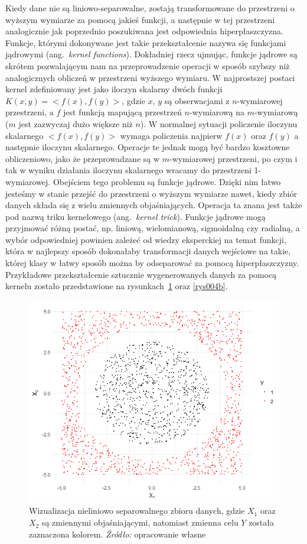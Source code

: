 \documentclass[12pt,a4paper,twoside,openany]{book}
\begin{document}
Kiedy dane nie są liniowo-separowalne, zostają transformowane do przestrzeni o wyższym wymiarze za pomocą jakieś funkcji, a następnie w tej przestrzeni analogicznie jak poprzednio poszukiwana jest odpowiednia hiperpłaszczyzna. Funkcje, którymi dokonywane jest takie przekształcenie nazywa się funkcjami jądrowymi (ang.~\textit{kernel functions}). Dokładniej rzecz ujmując, funkcje jądrowe są skrótem pozwalającym nam na przeprowadzenie operacji w sposób szybszy niż analogicznych obliczeń w przestrzeni wyższego wymiaru. W najprostszej postaci kernel zdefiniowany jest jako iloczyn skalarny dwóch funkcji $K(x, y) = <f(x), f(y)>$, gdzie $x$, $y$ są obserwacjami z $n$-wymiarowej przestrzeni, a $f$ jest funkcją mapującą przestrzeń $n$-wymiarową na $m$-wymiarową ($m$ jest zazwyczaj dużo większe niż $n$). W normalnej sytuacji policzenie iloczynu skalarnego $<f(x), f(y)>$ wymaga policzenia najpierw $f(x)$ oraz $f(y)$ a następnie iloczynu skalarnego. Operacje te jednak mogą być bardzo kosztowne obliczeniowo, jako że przeprowadzane są w $m$-wymiarowej przestrzeni, po czym i tak w wyniku działania iloczynu skalarnego wracamy do przestrzeni 1-wymiarowej. Obejściem tego problemu są funkcje jądrowe. Dzięki nim łatwo jesteśmy w stanie przejść do przestrzeni o wyższym wymiarze nawet, kiedy zbiór danych składa się z wielu zmiennych objaśniających. Operacja ta znana jest także pod nazwą triku kernelowego (ang.~\textit{kernel trick}). Funkcje jądrowe mogą przyjmować różną postać, np. liniową, wielomianową, sigmoidalną czy radialną, a wybór odpowiedniej powinien zależeć od wiedzy eksperckiej na temat funkcji, która w najlepszy sposób dokonałaby transformacji danych wejściowe na takie, której klasy w łatwy sposób można by odseparować za pomocą hiperpłaszczyzny. Przykładowe przekształcenie sztucznie wygenerowanych danych za pomocą kernelu zostało przedstawione na rysunkach~\ref{rys004a} oraz \ref{rys004b}.

\begin{figure}
\centering
\includegraphics[scale=0.82]{./rys004a}
\caption {Wizualizacja nieliniowo separowalnego zbioru danych, gdzie $X_1$ oraz $X_2$ są zmiennymi objaśniającymi, natomiast zmienna celu $Y$ została zaznaczona kolorem. \textit{Źródło:} opracowanie własne}\label{rys004a}
\end{figure}
\end{document}
